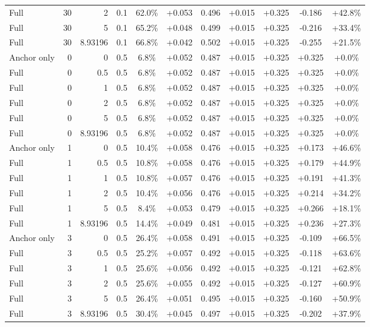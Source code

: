 \begin{table}[htbp]
\begin{tabular}{lrrrccccccc}
Full & 30 & 2 & 0.1 & 62.0\% & +0.053 & 0.496 & +0.015 & +0.325 & -0.186 & +42.8\% \\
Full & 30 & 5 & 0.1 & 65.2\% & +0.048 & 0.499 & +0.015 & +0.325 & -0.216 & +33.4\% \\
Full & 30 & 8.93196 & 0.1 & 66.8\% & +0.042 & 0.502 & +0.015 & +0.325 & -0.255 & +21.5\% \\
Anchor only & 0 & 0 & 0.5 & 6.8\% & +0.052 & 0.487 & +0.015 & +0.325 & +0.325 & +0.0\% \\
Full & 0 & 0.5 & 0.5 & 6.8\% & +0.052 & 0.487 & +0.015 & +0.325 & +0.325 & +0.0\% \\
Full & 0 & 1 & 0.5 & 6.8\% & +0.052 & 0.487 & +0.015 & +0.325 & +0.325 & +0.0\% \\
Full & 0 & 2 & 0.5 & 6.8\% & +0.052 & 0.487 & +0.015 & +0.325 & +0.325 & +0.0\% \\
Full & 0 & 5 & 0.5 & 6.8\% & +0.052 & 0.487 & +0.015 & +0.325 & +0.325 & +0.0\% \\
Full & 0 & 8.93196 & 0.5 & 6.8\% & +0.052 & 0.487 & +0.015 & +0.325 & +0.325 & +0.0\% \\
Anchor only & 1 & 0 & 0.5 & 10.4\% & +0.058 & 0.476 & +0.015 & +0.325 & +0.173 & +46.6\% \\
Full & 1 & 0.5 & 0.5 & 10.8\% & +0.058 & 0.476 & +0.015 & +0.325 & +0.179 & +44.9\% \\
Full & 1 & 1 & 0.5 & 10.8\% & +0.057 & 0.476 & +0.015 & +0.325 & +0.191 & +41.3\% \\
Full & 1 & 2 & 0.5 & 10.4\% & +0.056 & 0.476 & +0.015 & +0.325 & +0.214 & +34.2\% \\
Full & 1 & 5 & 0.5 & 8.4\% & +0.053 & 0.479 & +0.015 & +0.325 & +0.266 & +18.1\% \\
Full & 1 & 8.93196 & 0.5 & 14.4\% & +0.049 & 0.481 & +0.015 & +0.325 & +0.236 & +27.3\% \\
Anchor only & 3 & 0 & 0.5 & 26.4\% & +0.058 & 0.491 & +0.015 & +0.325 & -0.109 & +66.5\% \\
Full & 3 & 0.5 & 0.5 & 25.2\% & +0.057 & 0.492 & +0.015 & +0.325 & -0.118 & +63.6\% \\
Full & 3 & 1 & 0.5 & 25.6\% & +0.056 & 0.492 & +0.015 & +0.325 & -0.121 & +62.8\% \\
Full & 3 & 2 & 0.5 & 25.6\% & +0.055 & 0.492 & +0.015 & +0.325 & -0.127 & +60.9\% \\
Full & 3 & 5 & 0.5 & 26.4\% & +0.051 & 0.495 & +0.015 & +0.325 & -0.160 & +50.9\% \\
Full & 3 & 8.93196 & 0.5 & 30.4\% & +0.045 & 0.497 & +0.015 & +0.325 & -0.202 & +37.9\% \\

\end{tabular}
\end{table}
